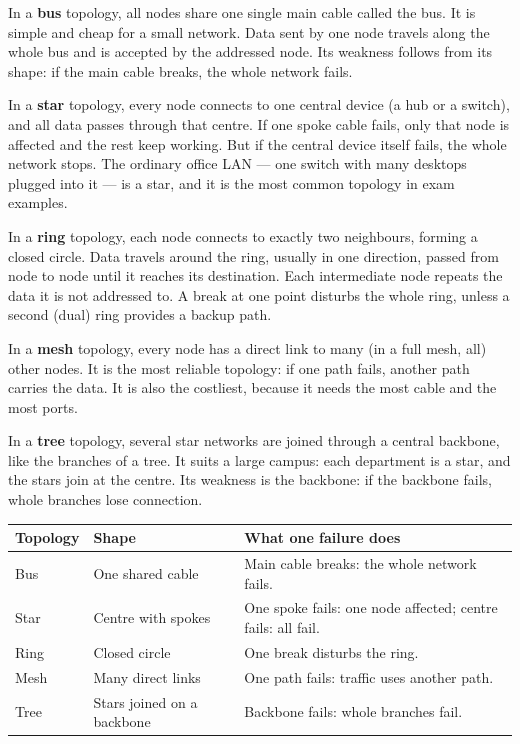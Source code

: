\documentclass[11pt]{article}
\begin{document}
In a \textbf{bus} topology, all nodes share one single main cable called the
bus. It is simple and cheap for a small network. Data sent by one node
travels along the whole bus and is accepted by the addressed node. Its
weakness follows from its shape: if the main cable breaks, the whole network
fails.

In a \textbf{star} topology, every node connects to one central device (a
hub or a switch), and all data passes through that centre. If one spoke cable
fails, only that node is affected and the rest keep working. But if the
central device itself fails, the whole network stops. The ordinary office LAN
--- one switch with many desktops plugged into it --- is a star, and it is
the most common topology in exam examples.

In a \textbf{ring} topology, each node connects to exactly two neighbours,
forming a closed circle. Data travels around the ring, usually in one
direction, passed from node to node until it reaches its destination. Each
intermediate node repeats the data it is not addressed to. A break at one
point disturbs the whole ring, unless a second (dual) ring provides a backup
path.

In a \textbf{mesh} topology, every node has a direct link to many (in a full
mesh, all) other nodes. It is the most reliable topology: if one path fails,
another path carries the data. It is also the costliest, because it needs the
most cable and the most ports.

In a \textbf{tree} topology, several star networks are joined through a
central backbone, like the branches of a tree. It suits a large campus: each
department is a star, and the stars join at the centre. Its weakness is the
backbone: if the backbone fails, whole branches lose connection.

\begin{center}
\begin{tabular}{p{}p{}p{}}
\toprule
\textbf{Topology} & \textbf{Shape} & \textbf{What one failure does} \\
\midrule
Bus & One shared cable & Main cable breaks: the whole network fails. \\
Star & Centre with spokes & One spoke fails: one node affected; centre fails: all fail. \\
Ring & Closed circle & One break disturbs the ring. \\
Mesh & Many direct links & One path fails: traffic uses another path. \\
Tree & Stars joined on a backbone & Backbone fails: whole branches fail. \\
\bottomrule
\end{tabular}
\end{center}
\end{document}
